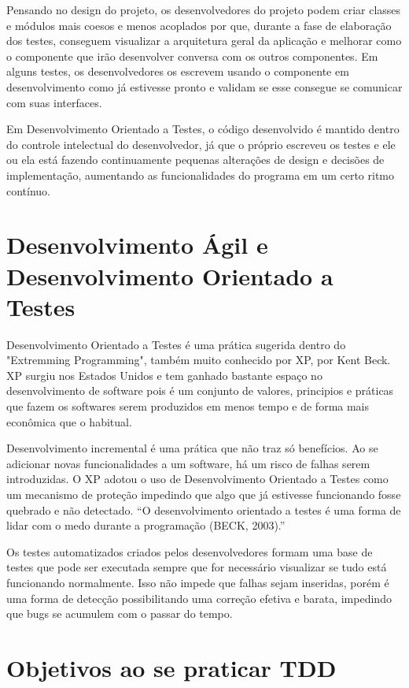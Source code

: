 \documentclass[12pt]{article}
\begin{document}
  Pensando no design do projeto, os desenvolvedores do projeto podem criar
  classes e módulos mais coesos e menos acoplados por que, durante a fase de 
  elaboração dos testes, conseguem visualizar a arquitetura geral da aplicação e
  melhorar como o componente que irão desenvolver conversa com os outros 
  componentes. Em alguns testes, os desenvolvedores os escrevem usando o 
  componente em desenvolvimento como já estivesse pronto e validam se
  esse consegue se comunicar com suas interfaces.

  Em Desenvolvimento Orientado a Testes, o código desenvolvido é mantido dentro do controle
  intelectual do desenvolvedor, já que o próprio escreveu os testes e ele ou 
  ela está fazendo continuamente pequenas alterações de design e decisões de 
  implementação, aumentando as funcionalidades do programa em um certo ritmo 
  contínuo.

  \section{Desenvolvimento Ágil e Desenvolvimento Orientado a Testes}

  Desenvolvimento Orientado a Testes é uma prática sugerida dentro do "Extremming 
  Programming", também muito conhecido por XP, por Kent Beck. XP surgiu nos
  Estados Unidos e tem ganhado bastante espaço no desenvolvimento de software
  pois é um conjunto de valores, principios e práticas que fazem os softwares 
  serem produzidos em menos tempo e de forma mais econômica que o habitual.

  Desenvolvimento incremental é uma prática que não traz só benefícios. Ao se
  adicionar novas funcionalidades a um software, há um risco de falhas serem 
  introduzidas. O XP adotou o uso de Desenvolvimento Orientado a Testes
  como um mecanismo
  de proteção impedindo que algo que já estivesse funcionando fosse quebrado
  e não detectado. “O desenvolvimento orientado a testes é uma forma de lidar 
  com o medo durante a programação (BECK, 2003).”

  Os testes automatizados criados pelos desenvolvedores formam uma base de 
  testes que pode ser executada sempre que for necessário visualizar se tudo está
  funcionando normalmente. Isso não impede que falhas sejam inseridas, porém
  é uma forma de detecção possibilitando uma correção efetiva e barata, impedindo
  que bugs se acumulem com o passar do tempo.

  \section{Objetivos ao se praticar TDD}
\end{document}
